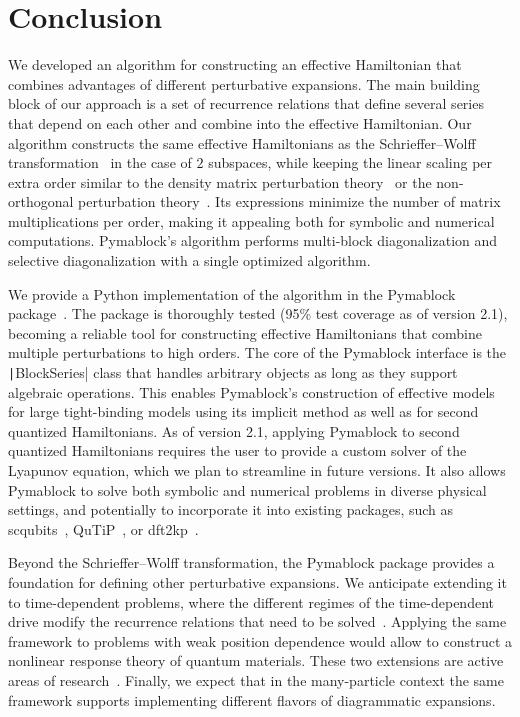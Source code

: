\section{Conclusion}

We developed an algorithm for constructing an effective Hamiltonian that combines advantages of different perturbative expansions.
The main building block of our approach is a set of recurrence relations that define several series that depend on each other and combine into the effective Hamiltonian.
Our algorithm constructs the same effective Hamiltonians as the Schrieffer--Wolff transformation~\cite{Schrieffer_1966} in the case of $2$ subspaces, while keeping the linear scaling per extra order similar to the density matrix perturbation theory~\cite{McWeeny_1962, Truflandier_2020} or the non-orthogonal perturbation theory~\cite{Bloch_1958}.
Its expressions minimize the number of matrix multiplications per order, making it appealing both for symbolic and numerical computations.
Pymablock's algorithm performs multi-block diagonalization and selective diagonalization with a single optimized algorithm.

We provide a Python implementation of the algorithm in the Pymablock package~\cite{Araya_2024}.
The package is thoroughly tested (95\% test coverage as of version 2.1), becoming a reliable tool for constructing effective Hamiltonians that combine multiple perturbations to high orders.
The core of the Pymablock interface is the \texttt|BlockSeries| class that handles arbitrary objects as long as they support algebraic operations.
This enables Pymablock's construction of effective models for large tight-binding models using its implicit method as well as for second quantized Hamiltonians.
As of version 2.1, applying Pymablock to second quantized Hamiltonians requires the user to provide a custom solver of the Lyapunov equation, which we plan to streamline in future versions.
It also allows Pymablock to solve both symbolic and numerical problems in diverse physical settings, and potentially to incorporate it into existing packages, such as scqubits~\cite{Groszkowski_2021}, QuTiP~\cite{Johansson_2012,Johansson_2013}, or dft2kp~\cite{Cassiano_2024}.

Beyond the Schrieffer--Wolff transformation, the Pymablock package provides a foundation for defining other perturbative expansions.
We anticipate extending it to time-dependent problems, where the different regimes of the time-dependent drive modify the recurrence relations that need to be solved~\cite{Rodriguez-Vega_2018,Malekakhlagh_2020}.
Applying the same framework to problems with weak position dependence would allow to construct a nonlinear response theory of quantum materials.
These two extensions are active areas of research~\cite{Motzoi_2009,Theis_2018,Bernevig_2021,Venkatraman_2022,Xu_2024b, Reascos_2024}.
Finally, we expect that in the many-particle context the same framework supports implementing different flavors of diagrammatic expansions.
